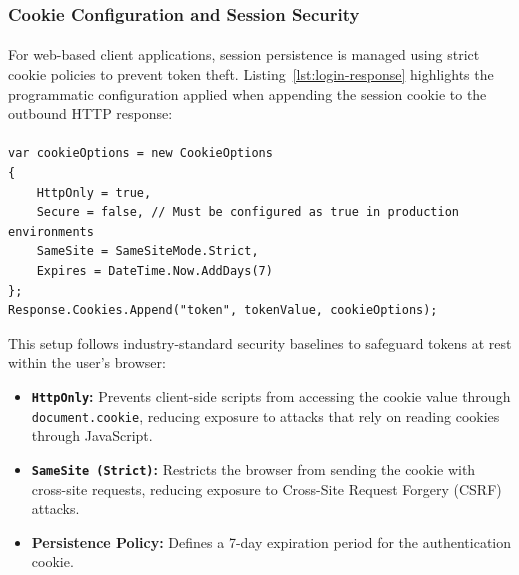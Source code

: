 \subsubsection{Cookie Configuration and Session Security}
\paragraph{}For web-based client applications, session persistence is managed using strict cookie policies to prevent token theft. Listing~\ref{lst:login-response} highlights the programmatic configuration applied when appending the session cookie to the outbound HTTP response:
\paragraph{}
\paragraph{}
\paragraph{}
\paragraph{}
\begin{lstlisting}[caption={Authentication Cookie Configuration}, label={lst:login-response}]
var cookieOptions = new CookieOptions
{
    HttpOnly = true,
    Secure = false, // Must be configured as true in production environments
    SameSite = SameSiteMode.Strict,
    Expires = DateTime.Now.AddDays(7)
};
Response.Cookies.Append("token", tokenValue, cookieOptions);
\end{lstlisting}

This setup follows industry-standard security baselines to safeguard tokens at rest within the user's browser:
\begin{itemize}
    \item \textbf{\texttt{HttpOnly}:} Prevents client-side scripts from accessing the cookie value through \texttt{document.cookie}, reducing exposure to attacks that rely on reading cookies through JavaScript.
    \item \textbf{\texttt{SameSite (Strict)}:} Restricts the browser from sending the cookie with cross-site requests, reducing exposure to Cross-Site Request Forgery (CSRF) attacks.
    \item \textbf{Persistence Policy:} Defines a 7-day expiration period for the authentication cookie.
\end{itemize}
